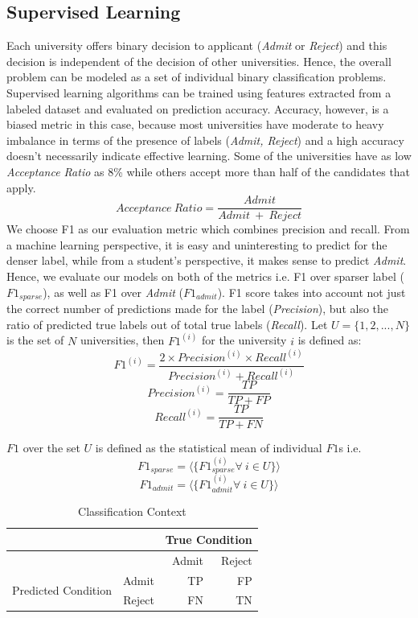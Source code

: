 \documentclass{sig-alternate-05-2015}
\begin{document}
\subsection{Supervised Learning}
\label{subsec:supervised-learning}
Each university offers binary decision to applicant (\textit{Admit} or \textit{Reject}) and this decision is independent of the decision of other universities. Hence, the overall problem can be modeled as a set of individual binary classification problems. Supervised learning algorithms can be trained using features extracted from a labeled dataset and evaluated on prediction accuracy. Accuracy, however, is a biased metric in this case, because most universities have moderate to heavy imbalance in terms of the presence of labels (\textit{Admit, Reject}) and a high accuracy doesn't necessarily indicate effective learning. Some of the universities have as low \textit{Acceptance Ratio} as 8\% while others accept more than half of the candidates that apply.
$$Acceptance~Ratio = \frac{Admit}{Admit~+~Reject}$$
We choose F1 as our evaluation metric which combines precision and recall. From a machine learning perspective, it is easy and uninteresting to predict for the denser label, while from a student's perspective, it makes sense to predict \textit{Admit}. Hence, we evaluate our models on both of the metrics i.e. F1 over sparser label ($F1_{sparse}$), as well as F1 over \textit{Admit} ($F1_{admit}$). F1 score takes into account not just the correct number of predictions made for the label (\textit{Precision}), but also the ratio of predicted true labels out of total true labels (\textit{Recall}). Let $U=\{1,2,...,N\}$ is the set of $N$ universities, then $F1^{(i)}$ for the university $i$ is defined as:
$$F1^{(i)} = \frac{2 \times Precision^{(i)} \times Recall^{(i)}}{Precision^{(i)} + Recall^{(i)}}$$
$$Precision^{(i)} = \frac{TP}{TP + FP}$$
$$Recall^{(i)} = \frac{TP}{TP + FN}$$

$F1$ over the set $U$ is defined as the statistical mean of individual $F1$s i.e.
$$F1_{sparse} = \langle \{ F1^{(i)}_{sparse} \forall~i \in U \} \rangle $$
$$F1_{admit} = \langle \{ F1^{(i)}_{admit} \forall~i \in U \} \rangle $$

\begin{table}[]
\centering
\caption{Classification Context}
\label{tab:classification-context}
\begin{tabular}{|l|r|r|r|}
\hline
                  &  & \multicolumn{2}{r|}{True Condition} \\ \hline
                  &  &  Admit         & Reject          \\ \hline
\multirow{2}{*}{Predicted Condition} & Admit &  TP         & FP          \\ \cline{2-4} 
                  & Reject & FN          & TN          \\ \hline
\end{tabular}
\end{table}
\end{document}
